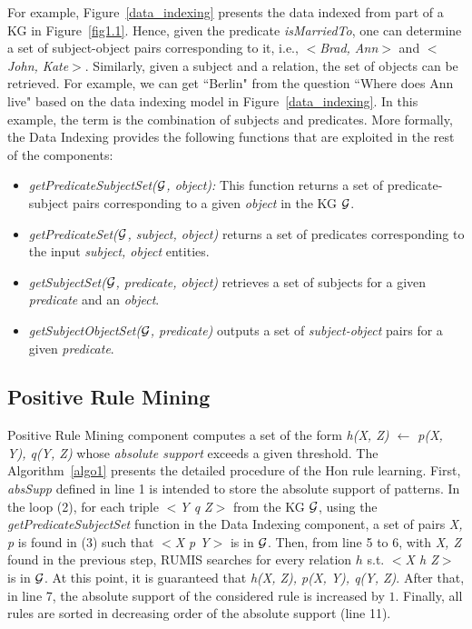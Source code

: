 For example, Figure~\ref{data_indexing} presents the data indexed from part of a KG in Figure~\ref{fig1.1}. Hence, given the predicate \textit{isMarriedTo}, one can determine a set of subject-object pairs corresponding to it, i.e., \textit{$<$Brad, Ann$>$} and \textit{$<$John, Kate$>$}. Similarly, given a subject and a relation, the set of objects can be retrieved. For example, we can get ``Berlin" from the question ``Where does Ann live" based on the data indexing model in Figure~\ref{data_indexing}. In this example, the term is the combination of subjects and predicates. More formally, the Data Indexing provides the following functions that are exploited in the rest of the components:

\begin{itemize}
\item \textit{getPredicateSubjectSet($\mathcal{G}$, object):} This function returns a set of predicate-subject pairs corresponding to a given \textit{object} in the KG $\mathcal{G}$.
\item \textit{getPredicateSet($\mathcal{G}$, subject, object)} returns a set of predicates corresponding to the input \textit{subject, object} entities.
\item \textit{getSubjectSet($\mathcal{G}$, predicate, object)} retrieves a set of subjects for a given \textit{predicate} and an \textit{ object}.
\item \textit{getSubjectObjectSet($\mathcal{G}$, predicate)} outputs a set of \textit{subject-object} pairs for a given \textit{predicate}.
\end{itemize}

\subsection{Positive Rule Mining}

Positive Rule Mining component computes a set of the form \textit{h(X, Z) $\leftarrow$ p(X, Y), q(Y, Z)} whose \textit{absolute support} exceeds a given threshold. The Algorithm~\ref{algo1} presents the detailed procedure of the Hon rule learning. First, \textit{absSupp} defined in line 1 is intended to store the absolute support of patterns. In the loop (2), for each triple \textit{$<$Y q Z$>$} from the KG $\mathcal{G}$, using the \textit{getPredicateSubjectSet} function in the Data Indexing component, a set of pairs \textit{X, p} is found in (3) such that \textit{$<$X p Y$>$} is in $\mathcal{G}$. Then, from line 5 to 6, with \textit{X, Z} found in the previous step, RUMIS searches for every relation $h$ s.t. \textit{$<$X h Z$>$} is in $\mathcal{G}$. At this point, it is guaranteed that \textit{h(X, Z), p(X, Y), q(Y, Z)}. After that, in line 7, the absolute support of the considered rule is increased by $1$. Finally, all rules are sorted in decreasing order of the absolute support (line 11).

